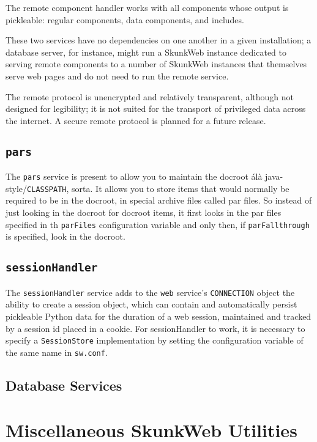 \documentclass[titlepage]{manual}
\begin{document}
The remote component handler works with all components whose output is 
pickleable: regular components, data components, and includes.

These two services have no dependencies on one another in a given installation;
a database server, for instance, might run a SkunkWeb instance dedicated to 
serving remote components to a number of SkunkWeb instances that themselves
serve web pages and do not need to run the remote service.  

The remote protocol is unencrypted and relatively transparent, although not 
designed for legibility; it is not suited for the transport of privileged data 
across the internet.  A secure remote protocol is planned for a future release.


\section{\texttt{pars}}

The \texttt{pars} service is present to allow you to maintain the
docroot \'al\`a java-style/\texttt{CLASSPATH}, sorta.  It allows you
to store items that would normally be required to be in the docroot,
in special archive files called par files.  So instead of just looking
in the docroot for docroot items, it first looks in the par files
specified in th \texttt{parFiles} configuration variable and only
then, if \texttt{parFallthrough} is specified, look in the docroot.

\section{\texttt{sessionHandler}}
The \texttt{sessionHandler} service adds to the \texttt{web}
service's \texttt{CONNECTION} object the ability to create a session object,
which can contain and automatically persist pickleable Python data for the 
duration of a web session, maintained and tracked by a session id placed 
in a cookie.  For sessionHandler to work, it is necessary to specify a 
\texttt{SessionStore} implementation by setting the configuration variable of
the same name in \texttt{sw.conf}.

\section{Database Services}
\label{databaseservices}

\chapter{Miscellaneous SkunkWeb Utilities}
\end{document}

